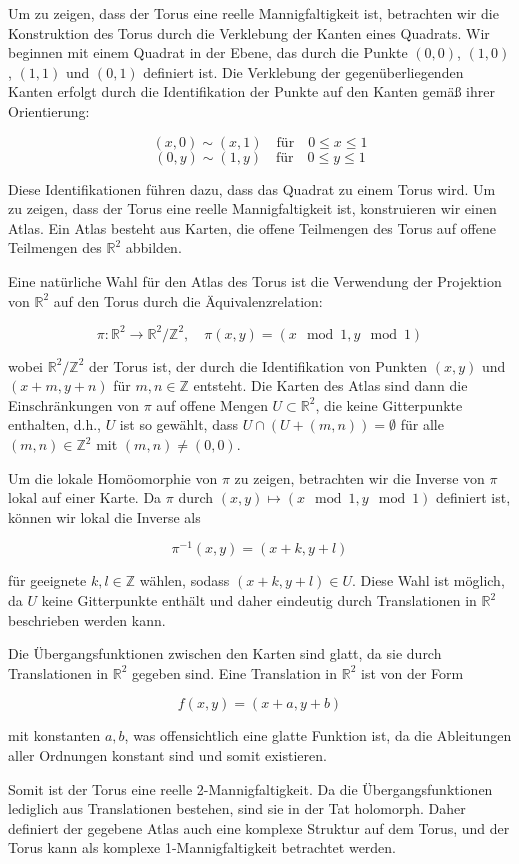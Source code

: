 Um zu zeigen, dass der Torus eine reelle Mannigfaltigkeit ist, betrachten wir die Konstruktion des Torus durch die Verklebung der Kanten eines Quadrats. Wir beginnen mit einem Quadrat in der Ebene, das durch die Punkte \( (0,0) \), \( (1,0) \), \( (1,1) \) und \( (0,1) \) definiert ist. Die Verklebung der gegenüberliegenden Kanten erfolgt durch die Identifikation der Punkte auf den Kanten gemäß ihrer Orientierung:

\[
(x,0) \sim (x,1) \quad \text{für} \quad 0 \leq x \leq 1
\]
\[
(0,y) \sim (1,y) \quad \text{für} \quad 0 \leq y \leq 1
\]

Diese Identifikationen führen dazu, dass das Quadrat zu einem Torus wird. Um zu zeigen, dass der Torus eine reelle Mannigfaltigkeit ist, konstruieren wir einen Atlas. Ein Atlas besteht aus Karten, die offene Teilmengen des Torus auf offene Teilmengen des \(\mathbb{R}^2\) abbilden.

Eine natürliche Wahl für den Atlas des Torus ist die Verwendung der Projektion von \(\mathbb{R}^2\) auf den Torus durch die Äquivalenzrelation:

\[
\pi: \mathbb{R}^2 \to \mathbb{R}^2 / \mathbb{Z}^2, \quad \pi(x,y) = (x \mod 1, y \mod 1)
\]

wobei \(\mathbb{R}^2 / \mathbb{Z}^2\) der Torus ist, der durch die Identifikation von Punkten \((x,y)\) und \((x+m, y+n)\) für \(m, n \in \mathbb{Z}\) entsteht. Die Karten des Atlas sind dann die Einschränkungen von \(\pi\) auf offene Mengen \(U \subset \mathbb{R}^2\), die keine Gitterpunkte enthalten, d.h., \(U\) ist so gewählt, dass \(U \cap (U + (m,n)) = \emptyset\) für alle \((m,n) \in \mathbb{Z}^2\) mit \((m,n) \neq (0,0)\).

Um die lokale Homöomorphie von \(\pi\) zu zeigen, betrachten wir die Inverse von \(\pi\) lokal auf einer Karte. Da \(\pi\) durch \((x,y) \mapsto (x \mod 1, y \mod 1)\) definiert ist, können wir lokal die Inverse als

\[
\pi^{-1}(x,y) = (x+k, y+l)
\]

für geeignete \(k, l \in \mathbb{Z}\) wählen, sodass \((x+k, y+l) \in U\). Diese Wahl ist möglich, da \(U\) keine Gitterpunkte enthält und daher eindeutig durch Translationen in \(\mathbb{R}^2\) beschrieben werden kann.

Die Übergangsfunktionen zwischen den Karten sind glatt, da sie durch Translationen in \(\mathbb{R}^2\) gegeben sind. Eine Translation in \(\mathbb{R}^2\) ist von der Form

\[
f(x,y) = (x+a, y+b)
\]

mit konstanten \(a, b\), was offensichtlich eine glatte Funktion ist, da die Ableitungen aller Ordnungen konstant sind und somit existieren.

Somit ist der Torus eine reelle 2-Mannigfaltigkeit. Da die Übergangsfunktionen lediglich aus Translationen bestehen, sind sie in der Tat holomorph. Daher definiert der gegebene Atlas auch eine komplexe Struktur auf dem Torus, und der Torus kann als komplexe 1-Mannigfaltigkeit betrachtet werden.

